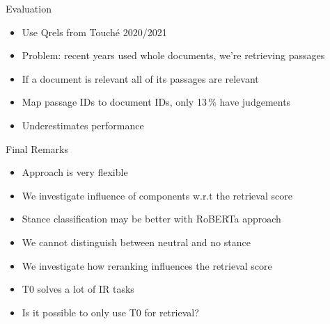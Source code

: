 \documentclass[english]{mlutalk}
\begin{document}
\begin{frame}{Evaluation}
    \begin{itemize}
      \item Use Qrels from Touché 2020/2021
      \item Problem: recent years used whole documents, we're retrieving passages
      \item If a document is relevant all of its passages are relevant
      \item Map passage IDs to document IDs, only 13\,\% have judgements
      \item Underestimates performance
    \end{itemize}
\end{frame}

\begin{frame}{Final Remarks}
    \begin{itemize}
        \item Approach is very flexible
        \item We investigate influence of components w.r.t the retrieval score
        \item Stance classification may be better with RoBERTa approach
        \item We cannot distinguish between neutral and no stance
        \item We investigate how reranking influences the retrieval score
        \item T0 solves a lot of IR tasks
        \item Is it possible to only use T0 for retrieval?
    \end{itemize}
    \thankyou
\end{frame}

\appendix
\section{\appendixname}

\bibliographyframe
\end{document}
